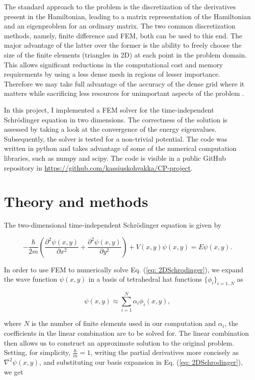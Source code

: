 \documentclass[a4paper,12pt]{article}
\begin{document}
The standard approach to the problem is the discretization of the derivatives present in the Hamiltonian, leading to a matrix representation of the Hamiltonian and an eigenproblem for an ordinary matrix. The two common discretization methods, namely, finite difference and FEM, both can be used to this end. The major advantage of the latter over the former is the ability to freely choose the size of the finite elements (triangles in 2D) at each point in the problem domain. This allows significant reductions in the computational cost and memory requirements by using a less dense mesh in regions of lesser importance. Therefore we may take full advantage of the accuracy of the dense grid where it matters while sacrificing less resources for unimportant aspects of the problem \cite{hutton}.

In this project, I implemented a FEM solver for the time-independent Schrödinger equation in two dimensions. The correctness of the solution is assessed by taking a look at the convergence of the energy eigenvalues. Subsequently, the solver is tested for a non-trivial potential. The code was written in python and takes advantage of some of the numerical computation libraries, such as numpy and scipy. The code is visible in a public GitHub repository in \url{https://github.com/kassiuskohvakka/CP-project}.


\cleardoublepage
\section{Theory and methods}

The two-dimensional time-independent Schrödinger equation is given by \cite{griffiths}

\begin{equation}
\label{eq: 2DSchrodinger}
-\frac{\hbar}{2m} \left( \frac{\partial^2 \psi (x,y)}{\partial x^2} + \frac{\partial^2 \psi (x,y)}{\partial y^2} \right) + V(x,y)\psi (x,y) = E \psi (x,y) .
\end{equation}

In order to use FEM to numerically solve Eq. (\ref{eq: 2DSchrodinger}), we expand the wave function $\psi (x,y)$ in a basis of tetrahedral hat functions $\lbrace \phi_i \rbrace_{i=1..N}$ as

\begin{equation}
\label{eq: basisExpansion}
\psi (x,y) \approx \sum_{i=1}^{N} \alpha_i \phi_i(x,y),
\end{equation}

where $N$ is the number of finite elements used in our computation and $\alpha_i$, the coefficients in the linear combination are to be solved for. The linear combination then allows us to construct an approximate solution to the original problem. Setting, for simplicity, $\frac{\hbar}{m} = 1$, writing the partial derivatives more concisely as $\nabla^2 \psi(x,y)$, and substituting our basis expansion in Eq. (\ref{eq: 2DSchrodinger}), we get 
\end{document}
